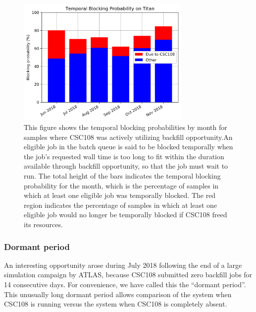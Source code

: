 \begin{figure}
  \includegraphics[width=0.75\textwidth]{images/barplot-temporal-blocking-by-month.png}
\caption{This figure shows the temporal blocking probabilities by month for
samples where CSC108 was actively utilizing backfill opportunity.An eligible
job in the batch queue is said to be blocked temporally when the job's
requested wall time is too long to fit within the duration available through
backfill opportunity, so that the job must wait to run. The total height of the
bars indicates the temporal blocking probability for the month, which is the
percentage of samples in which at least one eligible job was temporally
blocked. The red region indicates the percentage of samples in which at least
one eligible job would no longer be temporally blocked if CSC108 freed its
resources.}
\label{fig:temporal-blocking-by-month}
\end{figure}


\subsubsection{Dormant period}
\label{subsubsec:dormantperiod}

An interesting opportunity arose during July 2018 following the end of a large
simulation campaign by ATLAS, because CSC108 submitted zero backfill jobs for
14 consecutive days. For convenience, we have called this the ``dormant
period''. This unusually long dormant period allows comparison of the system
when CSC108 is running versus the system when CSC108 is completely absent.


